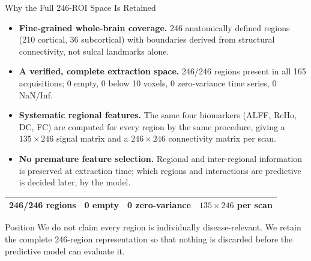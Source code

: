 
\begin{frame}{Why the Full 246-ROI Space Is Retained}

\small
\begin{itemize}
  \item \textbf{Fine-grained whole-brain coverage.} 246 anatomically
        defined regions (210 cortical, 36 subcortical) with boundaries
        derived from structural connectivity, not sulcal landmarks alone.
  \item \textbf{A verified, complete extraction space.} 246/246 regions
        present in all 165 acquisitions; 0 empty, 0 below 10 voxels,
        0 zero-variance time series, 0 NaN/Inf.
  \item \textbf{Systematic regional features.} The same four biomarkers
        (ALFF, ReHo, DC, FC) are computed for every region by the same
        procedure, giving a $135\times246$ signal matrix and a
        $246\times246$ connectivity matrix per scan.
  \item \textbf{No premature feature selection.} Regional and
        inter-regional information is preserved at extraction time;
        which regions and interactions are predictive is decided later,
        by the model.
\end{itemize}

\vspace{0.1cm}
\begin{center}\footnotesize
\begin{tabular}{llll}
\toprule
246/246 regions & 0 empty & 0 zero-variance & $135\times246$ per scan \\
\bottomrule
\end{tabular}
\end{center}

\vspace{0.05cm}
\begin{block}{Position}
We do not claim every region is individually disease-relevant. We retain the
complete 246-region representation so that nothing is discarded before the
predictive model can evaluate it.
\end{block}

\end{frame}


